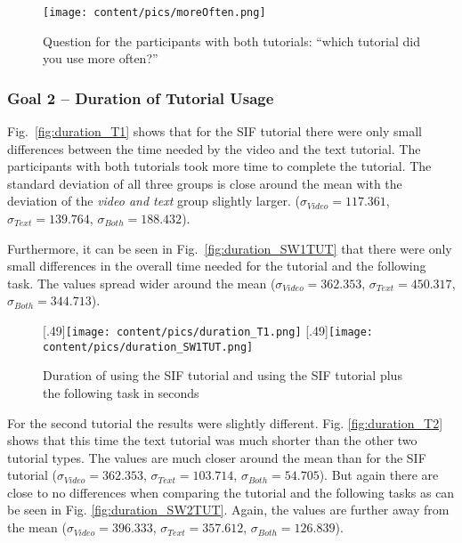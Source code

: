 \begin{figure}
	\centering
	\texttt{[image: content/pics/moreOften.png]}
	\caption{Question for the participants with both tutorials: \enquote{which tutorial did you use more often?}}
	\label{fig:moreOften}
\end{figure}


\subsubsection{Goal 2 -- Duration of Tutorial Usage}
 Fig.~\ref{fig:duration_T1} shows that for the SIF tutorial there were only small differences between the time needed by the video and the text tutorial. The participants with both tutorials took more time to complete the tutorial. The standard deviation of all three groups is close around the mean with the deviation of the \textit{video and text} group slightly larger. ($\sigma_{\mathit{Video}}=117.361$, $\sigma_{\mathit{Text}}=139.764$, $\sigma_{\mathit{Both}}=188.432$).
 
  Furthermore, it can be seen in Fig.~\ref{fig:duration_SW1TUT} that there were only small differences in the overall time needed for the tutorial and the following task. The values spread wider around the mean ($\sigma_{\mathit{Video}}=362.353$, $\sigma_{\mathit{Text}}= 450.317$, $\sigma_{\mathit{Both}}=344.713$).
 
 \begin{figure}
 	\centering
 	[.49\linewidth]{\texttt{[image: content/pics/duration\_T1.png]}}
 	[.49\linewidth]{\texttt{[image: content/pics/duration\_SW1TUT.png]}}
 	\caption{Duration of using the SIF tutorial and using the SIF tutorial plus the following task in seconds}
 \end{figure}

For the second tutorial the results were slightly different. Fig. \ref{fig:duration_T2} shows that this time the text tutorial was much shorter than the other two tutorial types. The values are much closer around the mean than for the SIF tutorial ($\sigma_{\mathit{Video}}=362.353$, $\sigma_{\mathit{Text}}= 103.714$, $\sigma_{\mathit{Both}}=54.705$).
But again there are close to no differences when comparing the tutorial and the following tasks as can be seen in Fig.
 \ref{fig:duration_SW2TUT}. Again, the values are further away from the mean ($\sigma_{\mathit{Video}}=396.333$, $\sigma_{\mathit{Text}}= 357.612$, $\sigma_{\mathit{Both}}=126.839$).


